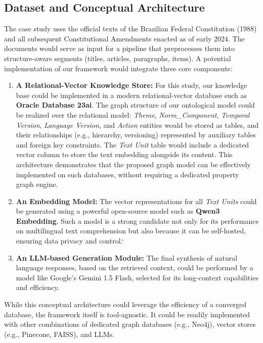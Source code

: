 \documentclass[11pt]{article}
\begin{document}
\subsection{Dataset and Conceptual Architecture}
\label{sec:implementation}
The case study uses the official texts of the Brazilian Federal Constitution (1988) and all subsequent Constitutional Amendments enacted as of early 2024. The documents would serve as input for a pipeline that preprocesses them into structure-aware segments (titles, articles, paragraphs, items). A potential implementation of our framework would integrate three core components:
\begin{enumerate}
    \item \textbf{A Relational-Vector Knowledge Store:} For this study, our knowledge base could be implemented in a modern relational-vector database such as \textbf{Oracle Database 23ai}. The graph structure of our ontological model could be realized over the relational model: \textit{Theme}, \textit{Norm\_Component}, \textit{Temporal Version}, \textit{Language Version}, and \textit{Action} entities would be stored as tables, and their relationships (e.g., hierarchy, versioning) represented by auxiliary tables and foreign key constraints. The \textit{Text Unit} table would include a dedicated vector column to store the text embedding alongside its content. This architecture demonstrates that the proposed graph model can be effectively implemented on such databases, without requiring a dedicated property graph engine.
    \item \textbf{An Embedding Model:} The vector representations for all \textit{Text Units} could be generated using a powerful open-source model such as \textbf{Qwen3 Embedding}. Such a model is a strong candidate not only for its performance on multilingual text comprehension but also because it can be self-hosted, ensuring data privacy and control.`

    \item \textbf{An LLM-based Generation Module:} The final synthesis of natural language responses, based on the retrieved context, could be performed by a model like Google's Gemini 1.5 Flash, selected for its long-context capabilities and efficiency.
\end{enumerate}

\noindent While this conceptual architecture could leverage the efficiency of a converged database, the framework itself is tool-agnostic. It could be readily implemented with other combinations of dedicated graph databases (e.g., Neo4j), vector stores (e.g., Pinecone, FAISS), and LLMs.
\end{document}
